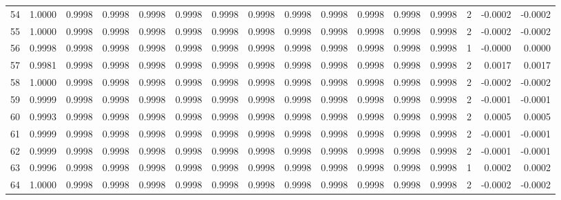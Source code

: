 \begin{tabular}{lrrrrrrrrrrrrrrr}
54  &      1.0000 &  0.9998 &  0.9998 &  0.9998 &  0.9998 &  0.9998 &  0.9998 &  0.9998 &  0.9998 &  0.9998 &   0.9998 &     0.9998 &      2 &                   -0.0002 &                    -0.0002 \\
55  &      1.0000 &  0.9998 &  0.9998 &  0.9998 &  0.9998 &  0.9998 &  0.9998 &  0.9998 &  0.9998 &  0.9998 &   0.9998 &     0.9998 &      2 &                   -0.0002 &                    -0.0002 \\
56  &      0.9998 &  0.9998 &  0.9998 &  0.9998 &  0.9998 &  0.9998 &  0.9998 &  0.9998 &  0.9998 &  0.9998 &   0.9998 &     0.9998 &      1 &                   -0.0000 &                     0.0000 \\
57  &      0.9981 &  0.9998 &  0.9998 &  0.9998 &  0.9998 &  0.9998 &  0.9998 &  0.9998 &  0.9998 &  0.9998 &   0.9998 &     0.9998 &      2 &                    0.0017 &                     0.0017 \\
58  &      1.0000 &  0.9998 &  0.9998 &  0.9998 &  0.9998 &  0.9998 &  0.9998 &  0.9998 &  0.9998 &  0.9998 &   0.9998 &     0.9998 &      2 &                   -0.0002 &                    -0.0002 \\
59  &      0.9999 &  0.9998 &  0.9998 &  0.9998 &  0.9998 &  0.9998 &  0.9998 &  0.9998 &  0.9998 &  0.9998 &   0.9998 &     0.9998 &      2 &                   -0.0001 &                    -0.0001 \\
60  &      0.9993 &  0.9998 &  0.9998 &  0.9998 &  0.9998 &  0.9998 &  0.9998 &  0.9998 &  0.9998 &  0.9998 &   0.9998 &     0.9998 &      2 &                    0.0005 &                     0.0005 \\
61  &      0.9999 &  0.9998 &  0.9998 &  0.9998 &  0.9998 &  0.9998 &  0.9998 &  0.9998 &  0.9998 &  0.9998 &   0.9998 &     0.9998 &      2 &                   -0.0001 &                    -0.0001 \\
62  &      0.9999 &  0.9998 &  0.9998 &  0.9998 &  0.9998 &  0.9998 &  0.9998 &  0.9998 &  0.9998 &  0.9998 &   0.9998 &     0.9998 &      2 &                   -0.0001 &                    -0.0001 \\
63  &      0.9996 &  0.9998 &  0.9998 &  0.9998 &  0.9998 &  0.9998 &  0.9998 &  0.9998 &  0.9998 &  0.9998 &   0.9998 &     0.9998 &      1 &                    0.0002 &                     0.0002 \\
64  &      1.0000 &  0.9998 &  0.9998 &  0.9998 &  0.9998 &  0.9998 &  0.9998 &  0.9998 &  0.9998 &  0.9998 &   0.9998 &     0.9998 &      2 &                   -0.0002 &                    -0.0002 \\

\end{tabular}
